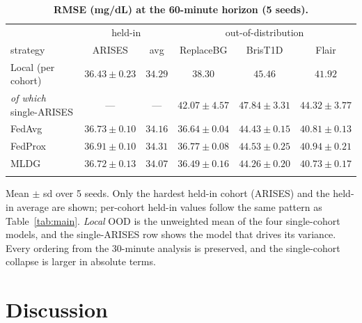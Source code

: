 \documentclass[10pt,letterpaper]{article}
\newlength\savedwidth
\newcommand\thickhline{\noalign{\global\savedwidth\arrayrulewidth\global\arrayrulewidth 2pt}%
\hline
\noalign{\global\arrayrulewidth\savedwidth}}
\begin{document}
\begin{table}[!ht]
\centering
\captionsetup{justification=centering,singlelinecheck=on}
\caption{\bf RMSE (mg/dL) at the 60-minute horizon (5 seeds).}
\label{tab:h60}
\begin{tabular}{lccccc}
\thickhline
 & \multicolumn{2}{c}{held-in} & \multicolumn{3}{c}{out-of-distribution} \\
strategy & ARISES & avg & ReplaceBG & BrisT1D & Flair \\
\hline
Local (per cohort) & $36.43 \pm 0.23$ & $34.29$ & $38.30$ & $45.46$ & $41.92$ \\
\;\emph{of which} single-ARISES & --- & --- & $42.07 \pm 4.57$ & $47.84 \pm 3.31$ & $44.32 \pm 3.77$ \\
\hline
FedAvg  & $36.73 \pm 0.10$ & $34.16$ & $36.64 \pm 0.04$ & $44.43 \pm 0.15$ & $40.81 \pm 0.13$ \\
FedProx & $36.91 \pm 0.10$ & $34.31$ & $36.77 \pm 0.08$ & $44.53 \pm 0.25$ & $40.94 \pm 0.21$ \\
MLDG    & $36.72 \pm 0.13$ & $\mathbf{34.07}$ & $\mathbf{36.49 \pm 0.16}$ & $\mathbf{44.26 \pm 0.20}$ & $\mathbf{40.73 \pm 0.17}$ \\
\thickhline
\end{tabular}
\begin{center}
{\small Mean $\pm$ sd over 5 seeds. Only the hardest held-in cohort (ARISES) and
the held-in average are shown; per-cohort held-in values follow the same pattern
as Table~\ref{tab:main}. \emph{Local} OOD is the unweighted mean of the four
single-cohort models, and the single-ARISES row shows the model that drives its
variance. Every ordering from the 30-minute analysis is preserved, and the
single-cohort collapse is larger in absolute terms.}
\end{center}
\end{table}

\section*{Discussion}
\end{document}
